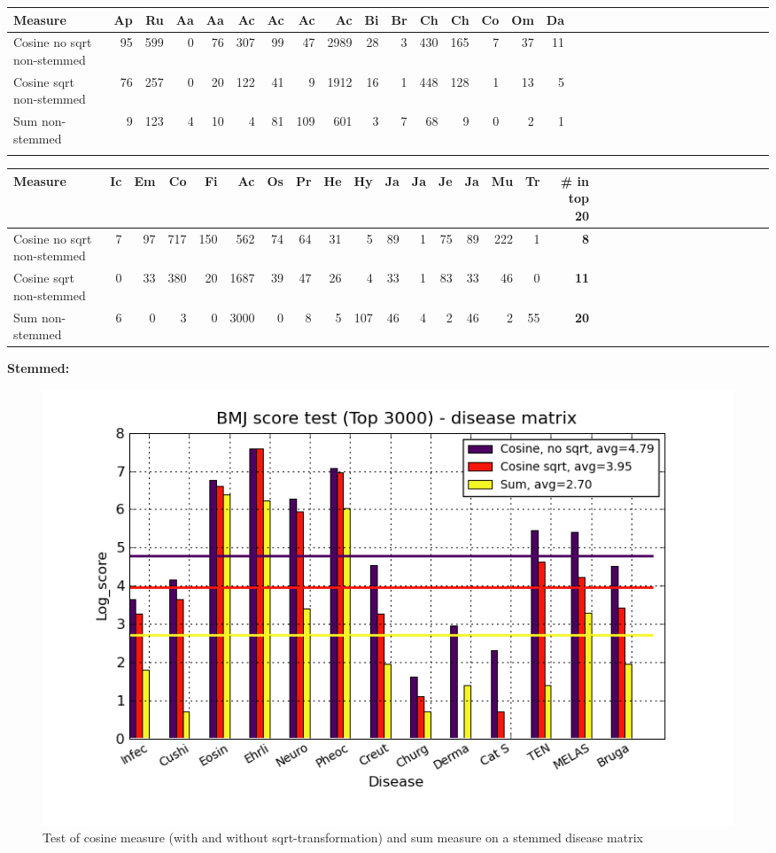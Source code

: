 \begin{table}[H]
  \begin{tiny}
    \begin{tabular}{|l|r|r|r|r|r|r|r|r|r|r|r|r|r|r|r|r|r|r|r|r|r|r|r|r|r|r|r|r|r|r|r|}
      \hline
      Measure &Ap&Ru&Aa&Aa&Ac&Ac&Ac&Ac&Bi&Br&Ch&Ch&Co&Om&Da\\
      \hline
      Cosine no sqrt non-stemmed &95&599&0&76&307&99&47&2989&28&3&430&165&7&37&11 \\
      \hline
      Cosine sqrt non-stemmed &76&257&0&20&122&41&9&1912&16&1&448&128&1&13&5 \\
      \hline
      Sum non-stemmed &9&123&4&10&4&81&109&601&3&7&68&9&0&2&1\\
      \hline
      \multicolumn{16}{c}{} \\
    \end{tabular}
    \begin{tabular}{|l|r|r|r|r|r|r|r|r|r|r|r|r|r|r|r|r|r|r|r|r|r|r|r|r|r|r|r|r|r|r|}
      \hline
      Measure &Ic&Em&Co&Fi&Ac&Os&Pr&He&Hy&Ja&Ja&Je&Ja&Mu&Tr &  \scriptsize{\textbf{\# in top 20}} \\
      \hline
      Cosine no sqrt non-stemmed &7&97&717&150&562&74&64&31&5&89&1&75&89&222&1 & \scriptsize{\textbf{8}} \\
      \hline
      Cosine sqrt non-stemmed &0&33&380&20&1687&39&47&26&4&33&1&83&33&46&0 &\scriptsize{\textbf{11}} \\
      \hline
      Sum non-stemmed &6&0&3&0&3000&0&8&5&107&46&4&2&46&2&55 & \scriptsize{\textbf{20}} \\
      \hline
    \end{tabular}
  \end{tiny}
\end{table}

\noindent \textbf{Stemmed:}

\begin{figure}[H]
  \caption{Test of cosine measure (with and without sqrt-transformation) and sum measure on a stemmed disease matrix}
  \begin{center}
    \includegraphics[width=1.2\textwidth]{barcharts/diseaseMatrix_bmj_hist_norm_3000_s_cos_sqrt_cos_sum_nn.png}
  \end{center}
  \label{diseaseMatrix_bmj_hist_norm_3000_s_cos_sqrt_cos_sum_nn}
\end{figure}


